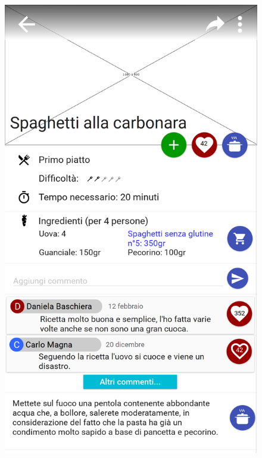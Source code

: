 \begin{figure}[H]
	\begin{minipage}{.49\textwidth}
		\includegraphics[width=\textwidth]{img/wireframe/presentazione_ricetta_ingrediente_cambiato_1.png}
	\end{minipage}
	\begin{minipage}{.49\textwidth}

\end{minipage}
\end{figure}
